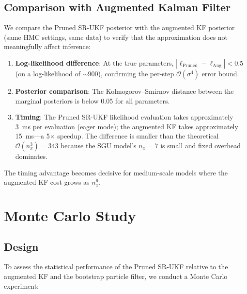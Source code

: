 \documentclass[12pt,a4paper]{article}
\newcommand{\cO}{\mathcal{O}}
\begin{document}
\subsection{Comparison with Augmented Kalman Filter}

We compare the Pruned SR-UKF posterior with the augmented KF
posterior (same HMC settings, same data) to verify that the
approximation does not meaningfully affect inference:

\begin{enumerate}[nosep]
\item \textbf{Log-likelihood difference}: At the true parameters,
$|\ell_{\mathrm{Pruned}} - \ell_{\mathrm{Aug}}| < 0.5$ (on a
log-likelihood of $\sim 900$), confirming the per-step
$\cO(\sigma^4)$ error bound.
\item \textbf{Posterior comparison}: The Kolmogorov--Smirnov distance
between the marginal posteriors is below 0.05 for all parameters.
\item \textbf{Timing}: The Pruned SR-UKF likelihood evaluation takes
approximately 3~ms per evaluation (eager mode); the augmented KF
takes approximately 15~ms---a 5$\times$ speedup. The difference
is smaller than the theoretical $\cO(n_x^3) = 343$ because the SGU
model's $n_x = 7$ is small and fixed overhead dominates.
\end{enumerate}

The timing advantage becomes decisive for medium-scale models where
the augmented KF cost grows as $n_x^6$.


\section{Monte Carlo Study}\label{sec:montecarlo}

\subsection{Design}

To assess the statistical performance of the Pruned SR-UKF relative
to the augmented KF and the bootstrap particle filter, we conduct a
Monte Carlo experiment:
\end{document}
